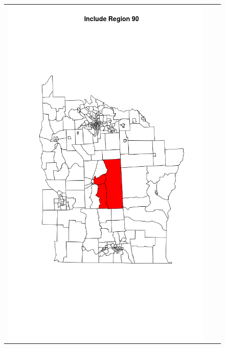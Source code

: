 \documentclass[12pt]{article}
\begin{document}
\begin{figure}[!ht]
\begin{tabular}{|c|c|c|}
						\includegraphics[scale=0.18]{ny90.png}

\end{tabular}
\end{figure}
\end{document}
